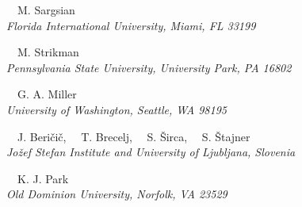 \begin{center}
\vspace{10px}

{~~M. Sargsian}\\
\ls
{\normalsize\it{Florida International University, Miami, FL 33199}}

\vspace{10px}

{~~M. Strikman}\\
\ls
{\normalsize\it{Pennsylvania State University, University Park, PA 16802}}

\vspace{10px}

{~~G. A. Miller}\\
\ls
{\normalsize\it{University of Washington, Seattle, WA 98195}}

\vspace{10px}

{~~J. Beri\v{c}i\v{c}, 
~~T. Brecelj, 
~~S. \v{S}irca, 
~~S. \v{S}tajner} \\
\ls
{\normalsize\it{Jo\v{z}ef Stefan Institute and University of Ljubljana, Slovenia}}

\vspace{10px}

{~~K. J. Park}\\
\ls
{\normalsize\it{Old Dominion University, Norfolk, VA 23529}}
\ks

%



\end{center}


\setcounter{footnote}{0}
